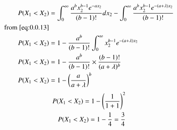 \documentclass[journal,12pt,twocolumn]{IEEEtran}
\begin{document}
\begin{enumerate}
\begin{align}
     \begin{split}
     P(X_1<X_2)&=\int_{0}^\infty \frac{a^b x_2^{b-1}e^{-ax_2}}{(b-1)!} dx_2-\int_{0}^\infty \frac{a^b x_2^{b-1}e^{-(a+\lambda)x_2}}{(b-1)!}\\
     \text{from \eqref{eq:0.0.13}}\\
     P(X_1<X_2)&=1-\frac{a^b}{(b-1)!}\int_{0}^\infty x_2 ^{b-1}e^{-(a+\lambda)x_2}\\
     P(X_1<X_2)&=1-\frac{a^b}{(b-1)!}\times \frac{(b-1)!}{(a+\lambda)^b}\\
     P(X_1<X_2)&=1-\left(\frac{a}{a+\lambda}\right)^b
     \end{split}
  \end{align}
      \begin{align}
      P(X_1<X_2)=1-\left(\frac{1}{1+1}\right)^2\\
      P(X_1<X_2)=1-\frac{1}{4}=\frac{3}{4}
  \end{align}
 
\end{enumerate}
\end{document}
